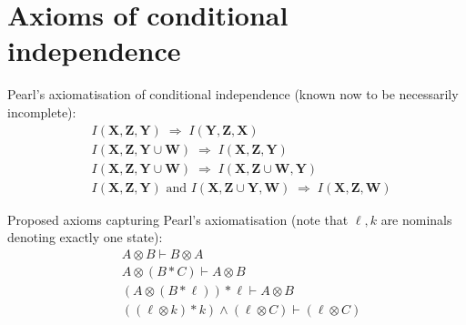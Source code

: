 \documentclass[envcountsame,envcountsect]{llncs}
\renewcommand{\vec}[1]{\mathbf{#1}}
\newcommand{\seq}[2]{\mbox{$#1 \vdash #2$}}
\newcommand{\indep}[3]{I({#1},{#2},{#3})}
\theoremstyle{plain}
\begin{document}
\section{Axioms of conditional independence}
\label{sec:CI_axioms}


Pearl's axiomatisation of conditional independence (known now to be necessarily incomplete):
\begin{align}
\label{I1}\tag{I1} & \indep{\vec{X}}{\vec{Z}}{\vec{Y}} \;\Rightarrow\; \indep{\vec{Y}}{\vec{Z}}{\vec{X}} \\
\label{I2}\tag{I2} & \indep{\vec{X}}{\vec{Z}}{\vec{Y} \cup \vec{W}} \;\Rightarrow\; \indep{\vec{X}}{\vec{Z}}{\vec{Y}} \\
\label{I3}\tag{I3} & \indep{\vec{X}}{\vec{Z}}{\vec{Y} \cup \vec{W}} \;\Rightarrow\; \indep{\vec{X}}{\vec{Z} \cup \vec{W}}{\vec{Y}} \\
\label{I4}\tag{I4} & \indep{\vec{X}}{\vec{Z}}{\vec{Y}} \mbox{ and } \indep{\vec{X}}{\vec{Z} \cup \vec{Y}}{\vec{W}} \;\Rightarrow\; \indep{\vec{X}}{\vec{Z}}{\vec{W}}
\end{align}

Proposed axioms capturing Pearl's axiomatisation (note that $\ell, k$ are nominals denoting exactly one state):
\begin{align}
\label{L1}\tag{L1} & \seq{A \otimes B}{B \otimes A} \\
\label{L2}\tag{L2} & \seq{A \otimes (B * C)}{A \otimes B} \\
\label{L3}\tag{L3} & \seq{(A \otimes (B * \ell)) * \ell}{A \otimes B} \\
\label{L4}\tag{L4} & \seq{((\ell \otimes k) * k) \wedge (\ell \otimes C)}{(\ell \otimes C)}
\end{align}


{\small


} %
\end{document}
